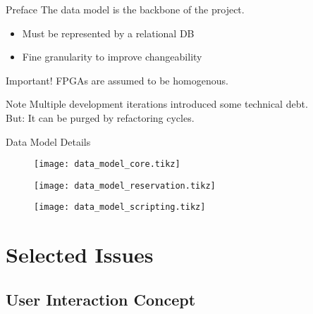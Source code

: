 \documentclass{beamer}
\begin{document}
    \begin{frame}{Preface}
        The data model is the backbone of the project.
        \begin{itemize}
            \item Must be represented by a relational DB
            \item Fine granularity to improve changeability
        \end{itemize}
        
        \begin{alertblock}{Important!}
            FPGAs are assumed to be homogenous.
        \end{alertblock}

        \begin{block}{Note}
            Multiple development iterations introduced some technical debt.\\
            But: It can be purged by refactoring cycles.
        \end{block}

    \end{frame}

    \begin{frame}{Data Model Details}
        \begin{figure}
            \centering
            \texttt{[image: data\_model\_core.tikz]}
        \end{figure}
        
    \framebreak
        \begin{figure}
            \centering
            \texttt{[image: data\_model\_reservation.tikz]}
        \end{figure}    

    \framebreak
        \begin{figure}
            \centering
            \texttt{[image: data\_model\_scripting.tikz]}
        \end{figure}
        
    \end{frame}

\section{Selected Issues}

\subsection{User Interaction Concept}
\end{document}
